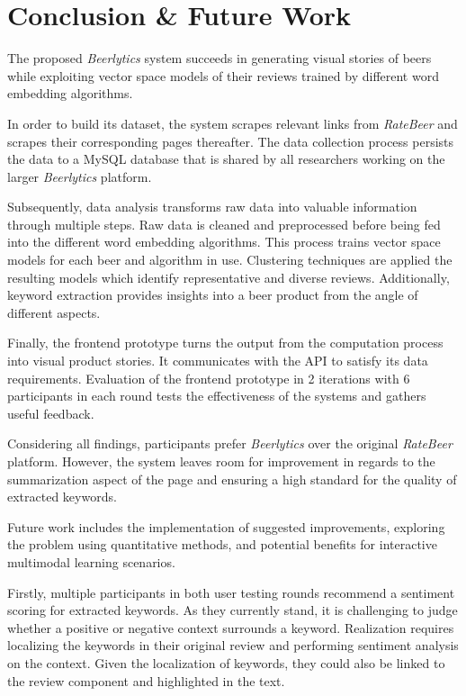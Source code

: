 \section{Conclusion \& Future Work} \label{sec:conclusion-future-work}
The proposed \textit{Beerlytics} system succeeds in generating visual stories of beers while exploiting vector space models of their reviews trained by different word embedding algorithms.

In order to build its dataset, the system scrapes relevant links from \textit{RateBeer} and scrapes their corresponding pages thereafter.
The data collection process persists the data to a MySQL database that is shared by all researchers working on the larger \textit{Beerlytics} platform.

Subsequently, data analysis transforms raw data into valuable information through multiple steps.
Raw data is cleaned and preprocessed before being fed into the different word embedding algorithms.
This process trains vector space models for each beer and algorithm in use.
Clustering techniques are applied the resulting models which identify representative and diverse reviews.
Additionally, keyword extraction provides insights into a beer product from the angle of different aspects.

Finally, the frontend prototype turns the output from the computation process into visual product stories.
It communicates with the API to satisfy its data requirements.
Evaluation of the frontend prototype in 2 iterations with 6 participants in each round tests the effectiveness of the systems and gathers useful feedback.

Considering all findings, participants prefer \textit{Beerlytics} over the original \textit{RateBeer} platform.
However, the system leaves room for improvement in regards to the summarization aspect of the page and ensuring a high standard for the quality of extracted keywords.

\hfill

\noindent
Future work includes the implementation of suggested improvements, exploring the problem using quantitative methods, and potential benefits for interactive multimodal learning scenarios.

Firstly, multiple participants in both user testing rounds recommend a sentiment scoring for extracted keywords.
As they currently stand, it is challenging to judge whether a positive or negative context surrounds a keyword.
Realization requires localizing the keywords in their original review and performing sentiment analysis on the context.
Given the localization of keywords, they could also be linked to the review component and highlighted in the text.

